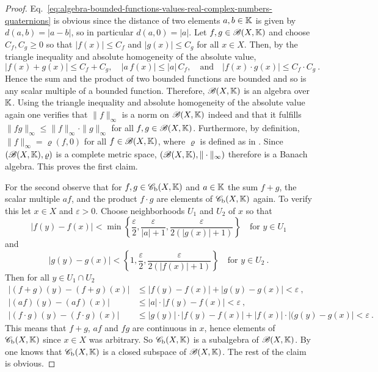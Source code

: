 \begin{proof}
  Eq.~\eqref{eq:algebra-bounded-functions-values-real-complex-numbers-quaternions} is obvious since
  the distance of two elements $a,b\in \mathbb{K}$ is given by $d(a,b) = |a-b|$, so in particular
  $d(a,0) = |a|$. Let $f,g \in \mathscr{B} (X,\mathbb{K})$ and choose $C_f,C_g \geq 0$ so that
  $ |f(x)| \leq C_f $ and $ |g(x)| \leq C_g $ for all $x \in X$. Then, by the triangle inequality
  and absolute homogeneity of the absolute value, 
  \[
    | f(x) + g (x)| \leq C_f + C_g , \quad | a\, f(x) | \leq |a| \, C_f , \quad \text{and} \quad
    | f(x) \cdot g (x)| \leq C_f \cdot C_g \ . 
  \]
  Hence the sum and the product of two bounded functions are bounded and so is any scalar multiple of a bounded function.
  Therefore, $\mathscr{B} (X,\mathbb{K})$ is an algebra over $\mathbb{K}$. Using the triangle inequality and absolute homogeneity of the
  absolute value again one verifies that  $ \|f \|_\infty$ is a norm on  $\mathscr{B} (X,\mathbb{K})$ indeed and that
  it fulfills $\|fg \|_\infty\leq \|f \|_\infty \cdot \|g \|_\infty$ for all $f,g \in \mathscr{B} (X,\mathbb{K})$. 
  Furthermore, by definition, $ \|f \|_\infty = \varrho (f,0)$ for all $f \in \mathscr{B} (X,\mathbb{K})$, where $\varrho$ is
  defined as in .
  Since $(\mathscr{B} (X,\mathbb{K}),\varrho) $ is a complete metric space,
  $(\mathscr{B} (X,\mathbb{K}),\|\cdot \|_\infty)$ therefore is a Banach algebra.  This proves the first claim.
   
  For the second observe that for $f, g \in \mathscr{C}_\textup{b} (X,\mathbb{K})$ and $a\in \mathbb{K}$ the
  sum $f+g$, the scalar multiple $af$, and the product $f\cdot g$ are elements of  $\mathscr{C}_\textup{b} (X,\mathbb{K})$ again.
  To verify this let $x\in X$ and $\varepsilon >0$. Choose neighborhoods
  $U_1$ and $U_2$ of $x$ so that
  \[
    | f (y) - f(x) |< \min \left\{\frac{\varepsilon}{2}, \frac{\varepsilon}{|a|+1}, \frac{\varepsilon}{2(|g(x)|+1)} \right\}
    \quad \text{for } y\in U_1
  \]   
  and
  \[
    | g(y) - g(x) | < \left\{1,\frac{\varepsilon}{2},\frac{\varepsilon}{2(|f(x)|+1)} \right\} \quad\text{for } y\in U_2 \ .
  \]
  Then for all $y\in U_1\cap U_2$ 
  \begin{equation*}
    \begin{split}
      | (f+g) (y) - (f+g) (x) | & \leq  | f (y) - f(x) | +  | g (y) - g (x) | < \varepsilon \ , \\
      | (af) (y) - (af) (x) | & \leq  |a|  \cdot | f (y) - f(x) | < \varepsilon \ , \\
      | (f\cdot g) (y) - (f\cdot g) (x) | & \leq |g(y)| \cdot | f (y) - f(x) |  +  |f(x) | \cdot | (g (y) - g (x) |
       < \varepsilon \ .
    \end{split}
  \end{equation*}
  This means that $f+g$, $af$ and $fg$ are continuous in $x$, hence elements of $\mathscr{C}_\textup{b} (X,\mathbb{K})$
  since $x \in X$ was arbitrary. So $\mathscr{C}_\textup{b} (X,\mathbb{K})$ is a subalgebra of $\mathscr{B} (X,\mathbb{K})$.   
  By  one knows that $\mathscr{C}_\textup{b} (X,\mathbb{K})$
  is a closed subspace of $\mathscr{B} (X,\mathbb{K})$. The rest of the claim is obvious.
\end{proof}

